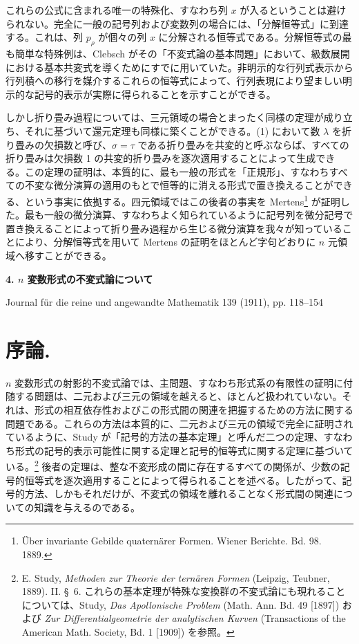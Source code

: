 \documentclass[11pt]{jlreq}
\begin{document}
これらの公式に含まれる唯一の特殊化、すなわち列 $x$ が入るということは避けられない。完全に一般の記号列および変数列の場合には、「分解恒等式」に到達する。これは、列 $p_\rho$ が個々の列 $x$ に分解される恒等式である。分解恒等式の最も簡単な特殊例は、Clebsch がその「不変式論の基本問題」において、級数展開における基本共変式を導くためにすでに用いていた。非明示的な行列式表示から行列積への移行を媒介するこれらの恒等式によって、行列表現により望ましい明示的な記号的表示が実際に得られることを示すことができる。

しかし折り畳み過程については、三元領域の場合とまったく同様の定理が成り立ち、それに基づいて還元定理も同様に築くことができる。(1) において数 $\lambda$ を折り畳みの欠損数と呼び、$\sigma=\tau$ である折り畳みを共変的と呼ぶならば、すべての折り畳みは欠損数 1 の共変的折り畳みを逐次適用することによって生成できる。この定理の証明は、本質的に、最も一般の形式を「正規形」、すなわちすべての不変な微分演算の適用のもとで恒等的に消える形式で置き換えることができる、という事実に依拠する。四元領域ではこの後者の事実を Mertens\footnote{Über invariante Gebilde quaternärer Formen. Wiener Berichte. Bd. 98. 1889.} が証明した。最も一般の微分演算、すなわちよく知られているように記号列を微分記号で置き換えることによって折り畳み過程から生じる微分演算を我々が知っていることにより、分解恒等式を用いて Mertens の証明をほとんど字句どおりに $n$ 元領域へ移すことができる。

\clearpage
\begin{center}
{\Large\bfseries 4. $n$ 変数形式の不変式論について}\par
\vspace{1.2em}
Journal für die reine und angewandte Mathematik 139 (1911), pp. 118--154
\end{center}

\section*{序論.}
$n$ 変数形式の射影的不変式論では、主問題、すなわち形式系の有限性の証明に付随する問題は、二元および三元の領域を越えると、ほとんど扱われていない。それは、形式の相互依存性およびこの形式間の関連を把握するための方法に関する問題である。これらの方法は本質的に、二元および三元の領域で完全に証明されているように、Study が「記号的方法の基本定理」と呼んだ二つの定理、すなわち形式の記号的表示可能性に関する定理と記号的恒等式に関する定理に基づいている。\footnote{E. Study, \emph{Methoden zur Theorie der ternären Formen} (Leipzig, Teubner, 1889). II. \S\ 6. これらの基本定理が特殊な変換群の不変式論にも現れることについては、Study, \emph{Das Apollonische Problem} (Math. Ann. Bd. 49 [1897]) および \emph{Zur Differentialgeometrie der analytischen Kurven} (Transactions of the American Math. Society, Bd. 1 [1909]) を参照。} 後者の定理は、整な不変形成の間に存在するすべての関係が、少数の記号的恒等式を逐次適用することによって得られることを述べる。したがって、記号的方法、しかもそれだけが、不変式の領域を離れることなく形式間の関連についての知識を与えるのである。
\end{document}
